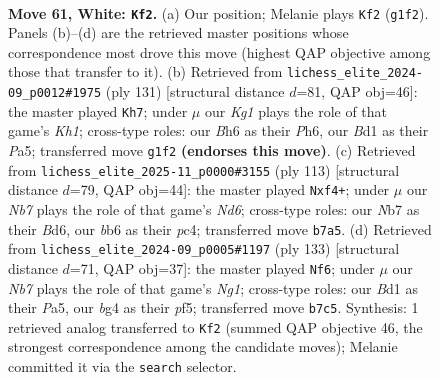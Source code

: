 \documentclass[11pt]{article}
\begin{document}
\clearpage

\begin{figure}[p]\centering
\begin{subfigure}{0.46\textwidth}\centering
\resizebox{\linewidth}{!}{%
\newchessgame
\chessboard[
  setfen={n7/1N1n1k2/1b5B/p2p4/6b1/PP2P2p/4P3/3B2K1 w - - 3 61},
  showmover=false,
  pgfstyle=straightmove, color=movearrow, markmove={g1-f2}
]}
\caption{}
\end{subfigure}\hfill
\begin{subfigure}{0.46\textwidth}\centering
\resizebox{\linewidth}{!}{%
\newchessgame
\chessboard[
  setfen={7k/2N3p1/7p/p2BB1b1/b2P4/5P2/8/5K2 b - - 2 66},
  showmover=false,
  pgfstyle=straightmove, color=movearrow, markmove={h8-h7}
]}
\caption{}
\end{subfigure}
\\[4pt]
\begin{subfigure}{0.46\textwidth}\centering
\resizebox{\linewidth}{!}{%
\newchessgame
\chessboard[
  setfen={8/k7/P2bp3/2p2p2/2P2P2/3nB3/6Kp/7N b - - 0 57},
  showmover=false,
  pgfstyle=straightmove, color=movearrow, markmove={d3-f4}
]}
\caption{}
\end{subfigure}\hfill
\begin{subfigure}{0.46\textwidth}\centering
\resizebox{\linewidth}{!}{%
\newchessgame
\chessboard[
  setfen={6n1/5k2/4p2p/p3BP1P/1bB1p1p1/1P6/5P2/5K2 b - - 0 67},
  showmover=false,
  pgfstyle=straightmove, color=movearrow, markmove={g8-f6}
]}
\caption{}
\end{subfigure}
\caption{\textbf{Move 61, White: \texttt{Kf2}.} (a) Our position; Melanie plays \texttt{Kf2} (\texttt{g1f2}). Panels (b)--(d) are the retrieved master positions whose correspondence most drove this move (highest QAP objective among those that transfer to it). (b) Retrieved from \texttt{lichess\_elite\_2024-09\_p0012\#1975} (ply 131) [structural distance $d$=81, QAP obj=46]: the master played \texttt{Kh7}; under $\mu$ our \emph{Kg1} plays the role of that game's \emph{Kh1}; cross-type roles: our \emph{B}h6 as their \emph{P}h6, our \emph{B}d1 as their \emph{P}a5; transferred move \texttt{g1f2} \textbf{(endorses this move)}. (c) Retrieved from \texttt{lichess\_elite\_2025-11\_p0000\#3155} (ply 113) [structural distance $d$=79, QAP obj=44]: the master played \texttt{Nxf4+}; under $\mu$ our \emph{Nb7} plays the role of that game's \emph{Nd6}; cross-type roles: our \emph{N}b7 as their \emph{B}d6, our \emph{b}b6 as their \emph{p}c4; transferred move \texttt{b7a5}. (d) Retrieved from \texttt{lichess\_elite\_2024-09\_p0005\#1197} (ply 133) [structural distance $d$=71, QAP obj=37]: the master played \texttt{Nf6}; under $\mu$ our \emph{Nb7} plays the role of that game's \emph{Ng1}; cross-type roles: our \emph{B}d1 as their \emph{P}a5, our \emph{b}g4 as their \emph{p}f5; transferred move \texttt{b7c5}. Synthesis: 1 retrieved analog transferred to \texttt{Kf2} (summed QAP objective 46, the strongest correspondence among the candidate moves); Melanie committed it via the \texttt{search} selector.}
\label{fig:thought-m120}
\end{figure}
\end{document}
